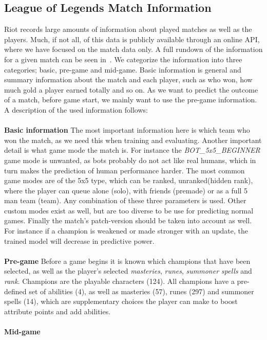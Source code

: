 \subsection{League of Legends Match Information}
Riot records large amounts of information about played matches as well as the players. Much, if not all, of this data is publicly available through an online API, where we have focused on the match data only. A full rundown of the information for a given match can be seen in~\cite{matchinfo}. We categorize the information into three categories; basic, pre-game and mid-game. Basic information is general and summary information about the match and each player, such as who won, how much gold a player earned totally and so on. As we want to predict the outcome of a match, before game start, we mainly want to use the pre-game information. A description of the used information follows:\\\\
\textbf{Basic information}
The most important information here is which team who won the match, as we need this when training and evaluating. Another important detail is what game mode the match is. For instance the \textit{BOT\_5x5\_BEGINNER} game mode is unwanted, as bots probably do not act like real humans, which in turn makes the prediction of human performance harder. The most common game modes are of the 5x5 type, which can be ranked, unranked(hidden rank), where the player can queue alone (solo), with friends (premade) or as a full 5 man team (team). Any combination of these three parameters is used. Other custom modes exist as well, but are too diverse to be use for predicting normal games. Finally the match’s patch-version should be taken into account as well. For instance if a champion is weakened or made stronger with an update, the trained model will decrease in predictive power.\\\\
\textbf{Pre-game}
Before a game begins it is known which champions that have been selected, as well as the player’s selected \textit{masteries}, \textit{runes}, \textit{summoner spells} and \textit{rank}. Champions are the playable characters (124). All champions have a pre-defined set of abilities (4), as well as masteries (57), runes (297) and summoner spells (14), which are supplementary choices the player can make to boost attribute points and add abilities.\\\\
\textbf{Mid-game}
